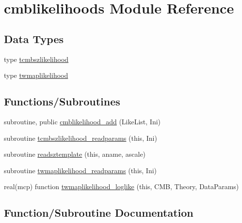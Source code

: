 \hypertarget{namespacecmblikelihoods}{}\section{cmblikelihoods Module Reference}
\label{namespacecmblikelihoods}
\subsection*{Data Types}
\begin{DoxyCompactItemize}
\item 
type \mbox{\hyperlink{structcmblikelihoods_1_1tcmbszlikelihood}{tcmbszlikelihood}}
\item 
type \mbox{\hyperlink{structcmblikelihoods_1_1twmaplikelihood}{twmaplikelihood}}
\end{DoxyCompactItemize}
\subsection*{Functions/\+Subroutines}
\begin{DoxyCompactItemize}
\item 
subroutine, public \mbox{\hyperlink{namespacecmblikelihoods_a6b235ad1e7fa8ebc5304542f01584617}{cmblikelihood\+\_\+add}} (Like\+List, Ini)
\item 
subroutine \mbox{\hyperlink{namespacecmblikelihoods_ae775cfc1ab138a93684346c644269110}{tcmbszlikelihood\+\_\+readparams}} (this, Ini)
\item 
subroutine \mbox{\hyperlink{namespacecmblikelihoods_ac2d0805940347a1cc9fc6d7ef007e082}{readsztemplate}} (this, aname, ascale)
\item 
subroutine \mbox{\hyperlink{namespacecmblikelihoods_a38cdfcee85309289ed17ecc5b60d5ff7}{twmaplikelihood\+\_\+readparams}} (this, Ini)
\item 
real(mcp) function \mbox{\hyperlink{namespacecmblikelihoods_a7c01807a08609a029a41a11b39ade069}{twmaplikelihood\+\_\+loglike}} (this, C\+MB, Theory, Data\+Params)
\end{DoxyCompactItemize}


\subsection{Function/\+Subroutine Documentation}
\mbox{\label{namespacecmblikelihoods_a6b235ad1e7fa8ebc5304542f01584617}} 
